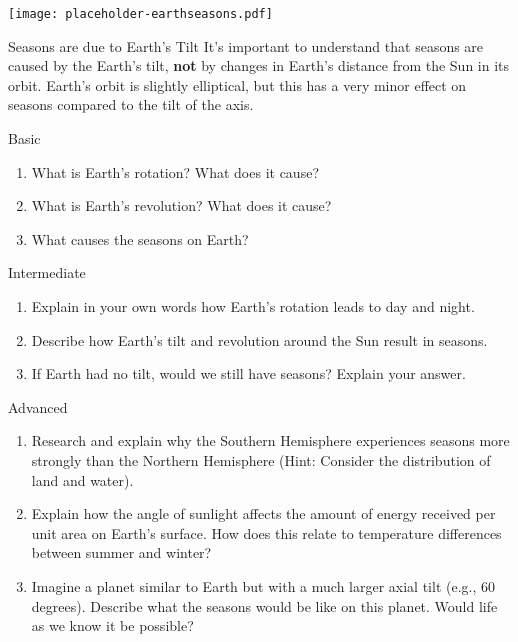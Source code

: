 \begin{marginfigure}
\texttt{[image: placeholder-earthseasons.pdf]}
\caption{\label{fig:earthseasons}Diagram illustrating Earth's tilt and the seasons. \textit{Image to be added.}}
\end{marginfigure}

\begin{keyconcept}{Seasons are due to Earth's Tilt}
It's important to understand that seasons are caused by the Earth's tilt, \textbf{not} by changes in Earth's distance from the Sun in its orbit.  Earth's orbit is slightly elliptical, but this has a very minor effect on seasons compared to the tilt of the axis.
\end{keyconcept}

\begin{tieredquestions}{Basic}
\begin{enumerate}
    \item What is Earth's rotation? What does it cause?
    \item What is Earth's revolution? What does it cause?
    \item What causes the seasons on Earth?
\end{enumerate}
\end{tieredquestions}

\begin{tieredquestions}{Intermediate}
\begin{enumerate}
    \item Explain in your own words how Earth's rotation leads to day and night.
    \item Describe how Earth's tilt and revolution around the Sun result in seasons.
    \item If Earth had no tilt, would we still have seasons? Explain your answer.
\end{enumerate}
\end{tieredquestions}

\begin{tieredquestions}{Advanced}
\begin{enumerate}
    \item Research and explain why the Southern Hemisphere experiences seasons more strongly than the Northern Hemisphere (Hint: Consider the distribution of land and water).
    \item Explain how the angle of sunlight affects the amount of energy received per unit area on Earth's surface. How does this relate to temperature differences between summer and winter?
    \item  Imagine a planet similar to Earth but with a much larger axial tilt (e.g., 60 degrees). Describe what the seasons would be like on this planet. Would life as we know it be possible?
\end{enumerate}
\end{tieredquestions}


